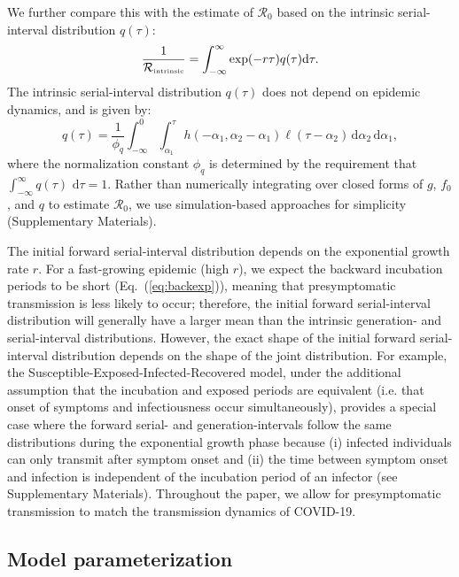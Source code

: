 \documentclass[12pt]{article}
\newcommand{\eref}[1]{Eq.~(\ref{eq:#1})}
\newcommand{\Rx}[1]{\ensuremath{{\mathcal R}_{#1}}\xspace}
\newcommand{\Ro}{\Rx{0}}
\newcommand{\Rintrinsic}{\ensuremath{{\mathcal R}_{\textrm{\tiny intrinsic}}}\xspace}
\newcommand{\dd}[1]{\ensuremath{\, \mathrm{d}#1}}
\newcommand{\dtau}{\dd{\tau}}
\newcommand{\pinf}{\ensuremath{\alpha_1}} %
\newcommand{\sinf}{\ensuremath{\alpha_2}} %
\newcommand{\idist}{\ell} %
\begin{document}
We further compare this with the estimate of \Ro based on the intrinsic serial-interval distribution $q(\tau)$:
\begin{equation}
\frac{1}{\Rintrinsic} = \int_{-\infty}^\infty \exp(-r\tau) q(\tau) \mathrm{d} \tau.
\label{eq:Rintrinsic}
\end{equation}
The intrinsic serial-interval distribution $q(\tau)$ does not depend on epidemic dynamics, and is given by:
\begin{equation}
q(\tau) = \frac{1}{\phi_q} \int_{-\infty}^{0} \int_{\pinf}^{\tau} h(-\pinf, \sinf - \pinf) \idist(\tau - \sinf) \, \mathrm{d}\sinf\,\mathrm{d}\pinf,
\label{eq:intrinsicSI}
\end{equation}
where the normalization constant $\phi_q$ is determined by the
requirement that $\int_{-\infty}^\infty q(\tau)\,\dtau=1$.
Rather than numerically integrating over closed forms of $g$, $f_0$, and $q$ to estimate $\Ro$, we use simulation-based approaches for simplicity (Supplementary Materials).

The initial forward serial-interval distribution depends on the exponential growth rate $r$.
For a fast-growing epidemic (high $r$), we expect the backward incubation periods to be short (\eref{backexp}), meaning that presymptomatic transmission is less likely to occur; 
therefore, the initial forward serial-interval distribution will generally have a larger mean than the intrinsic generation- and serial-interval distributions.
However, the exact shape of the initial forward serial-interval distribution depends on the shape of the joint distribution.
For example, the Susceptible-Exposed-Infected-Recovered model, under the additional assumption that the incubation and exposed periods are equivalent (i.e. that onset of symptoms and infectiousness occur simultaneously), provides a special case where the forward serial- and generation-intervals follow the same distributions during the exponential growth phase because (i) infected individuals can only transmit after symptom onset and (ii) the time between symptom onset and infection is independent of the incubation period of an infector (see Supplementary Materials).
Throughout the paper, we allow for presymptomatic transmission to match the transmission dynamics of COVID-19.

\subsection{Model parameterization}
\end{document}
